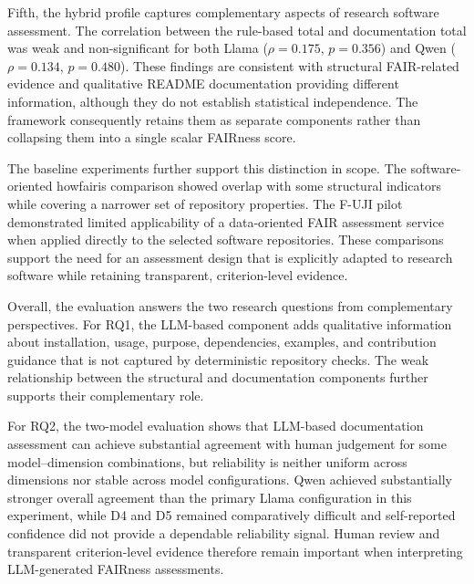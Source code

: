 Fifth, the hybrid profile captures complementary aspects of research
software assessment. The correlation between the rule-based total and
documentation total was weak and non-significant for both Llama
($\rho=0.175$, $p=0.356$) and Qwen ($\rho=0.134$, $p=0.480$).
These findings are consistent with structural FAIR-related evidence
and qualitative README documentation providing different information,
although they do not establish statistical independence. The
framework consequently retains them as separate components rather
than collapsing them into a single scalar FAIRness score.

The baseline experiments further support this distinction in scope.
The software-oriented howfairis comparison showed overlap with some
structural indicators while covering a narrower set of repository
properties. The F-UJI pilot demonstrated limited applicability of a
data-oriented FAIR assessment service when applied directly to the
selected software repositories. These comparisons support the need
for an assessment design that is explicitly adapted to research
software while retaining transparent, criterion-level evidence.

Overall, the evaluation answers the two research questions from
complementary perspectives. For RQ1, the LLM-based component adds
qualitative information about installation, usage, purpose,
dependencies, examples, and contribution guidance that is not
captured by deterministic repository checks. The weak relationship
between the structural and documentation components further supports
their complementary role.

For RQ2, the two-model evaluation shows that LLM-based documentation
assessment can achieve substantial agreement with human judgement for
some model--dimension combinations, but reliability is neither uniform
across dimensions nor stable across model configurations. Qwen
achieved substantially stronger overall agreement than the primary
Llama configuration in this experiment, while D4 and D5 remained
comparatively difficult and self-reported confidence did not provide
a dependable reliability signal. Human review and transparent
criterion-level evidence therefore remain important when interpreting
LLM-generated FAIRness assessments.
